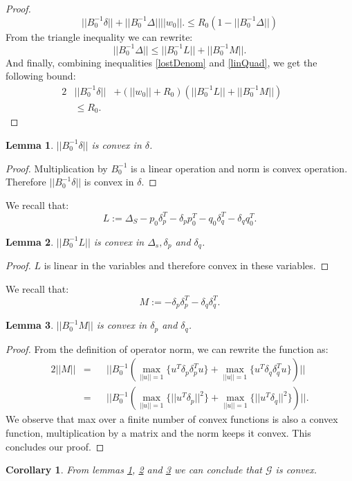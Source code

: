 \documentclass[11pt,twocolumn,varwidth=true,a4paper,fleqn]{article}
\newtheorem{lemma}{Lemma}
\newtheorem{corollary}{Corollary}
\begin{document}
\begin{proof}
\begin{equation}
||B_0^{-1}\delta|| + ||B_0^{-1}\Delta||||w_0||.
\leq R_0(1 -||B_0^{-1}\Delta||)
\end{equation}
From the triangle inequality we can rewrite:
\begin{equation} \label{linQuad}
||B_0^{-1}\Delta|| \leq ||B_0^{-1}L||+||B_0^{-1}M||.
\end{equation}
And finally, combining inequalities \ref{lostDenom} and \ref{linQuad},
we get the following bound:
\begin{alignat*}{2} \label{convexBound}
&||B_0^{-1}\delta|| &+ (||w_0||+R_0)(||B_0^{-1}L||+||B_0^{-1}M||) && \\ 
& \leq R_0. &&
\end{alignat*}
\end{proof}

\begin{lemma} \label{delta}
$||B_0^{-1}\delta||$ is convex in $\delta$.
\end{lemma}
\begin{proof}
Multiplication by $B_0^{-1}$ is a linear operation and norm is convex
operation. Therefore $||B_0^{-1}\delta||$ is convex in $\delta$.
\end{proof}

We recall that:
\begin{equation*} 
L:= \Delta_S - p_0\delta_p^T - \delta_pp_0^T - q_0\delta_q^T - \delta_qq_0^T.
\end{equation*}
\begin{lemma} \label{L}
$||B_0^{-1}L||$ is convex in $\Delta_s, \delta_p$
and $\delta_q$.
\end{lemma}
\begin{proof}
$L$ is linear in the variables and therefore convex in these variables.

\end{proof}

We recall that:
\begin{equation*} 
M:= - \delta_p\delta_p^T - \delta_q\delta_q^T.
\end{equation*}

\begin{lemma} \label{M}
$||B_0^{-1}M||$ is convex in $\delta_p$
and $\delta_q$.
\end{lemma}
\begin{proof}
From the definition of operator norm, we can rewrite the function as:
\begin{alignat*} {2}
||M|| & = && ||B_0^{-1}(\max_{||u||=1}{\{u^T \delta_p\delta_p^T u\}} +
\max_{||u||=1}{\{u^T \delta_q\delta_q^T u\}})||\\
& = && ||B_0^{-1}(\max_{||u||=1}{\{||u^T \delta_p||^2\}} +
\max_{||u||=1}{\{||u^T \delta_q||^2\}})||.
\end{alignat*}
We observe that max over a finite number of convex functions is also a convex
function, multiplication by a matrix and the norm keeps it convex.
This concludes our proof.
\end{proof}

\begin{corollary}
From lemmas \ref{delta}, \ref{L} and \ref{M} we can conclude that $\mathcal{G}$
is convex.
\end{corollary}
\end{document}
